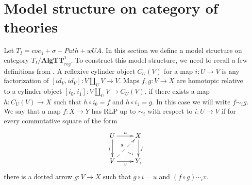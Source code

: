 \documentclass[reqno]{amsart}
\theoremstyle{definition}
\theoremstyle{remark}
\newcommand{\cat}[1]{\mathbf{#1}}
\newcommand{\Mod}[1]{#1\text{-}\cat{Mod}}
\newcommand{\algtt}{\cat{AlgTT}}
\newcommand{\cyli}{i}
\numberwithin{figure}{section}
\begin{document}
\begin{comment}
For every morphism $h : M \to N$ of models of $\mathbb{T}$, we can define a morphism $Lang^0_{con}(h) : Lang^0_{con}(M) \to Lang^0_{con}(N)$ of theories under $\mathbb{T}$ as $Lang(h)(O_a(\Gamma)) = O_{h(a)}(\Gamma)$.
Thus $Lang^0_{con}$ is a functor $\Mod{\mathbb{T}} \to \mathbb{T}/\algtt^0_{con}$.

\begin{prop}
$Lang^0_{con}$ is left adjoint to $Syn^0_{con}$.
\end{prop}
\begin{proof}
To prove this, it is enough to show that the composition of $Lang^0_{con}$ and the inclusion $\mathbb{T}/\algtt^0_{con} \to \mathbb{T}/\algtt^0$ is isomorphic to $Lang^0$.
Let $\alpha_M : Lang^0(M) \to Lang^0_{con}(M)$ be defined as $\alpha_M(O_a) = C_a$.
Let $\beta_M : Lang^0_{con}(M) \to Lang^0(M)$ be defined as $\beta_M(O_a(\Gamma)) = O_a|_{\Gamma = C_{M(ctx_{p,n})(a)}}$.
To prove that $\alpha$ and $\beta$ are inverses of each other, we need to show that $\sststile{}{\Gamma} O_a(\Gamma) \cong C_a|_{\Gamma = C_{M(ctx_{p,n})(a)}}$ is a theorem of $Lang^0_{con}(M)$.
But this follows from the first axiom of $Lang^0_{con}(M)$.
\end{proof}

For every algebraic dependent type theory with substitutions $\mathbb{T}$, there are adjoint functors $Lang^1 \dashv Syn^1 : \mathbb{T}/\algtt^1 \to \Mod{\mathbb{T}}$.
For every contextual algebraic dependent type theory with substitutions $\mathbb{T}$, there are adjoint functors $Lang^1_{con} \dashv Syn^1_{con} : \mathbb{T}/\algtt^1_{con} \to \Mod{\mathbb{T}}$.
These functors are defined in the same way as $Lang^0 \dashv Syn^0$ and $Lang^0_{con} \dashv Syn^0_{con}$.
\end{comment}

\section{Model structure on category of theories}

Let $T_I = coe_1 + \sigma + Path + wUA$.
In this section we define a model structure on category $T_I/\algtt^1_{reg}$.
To construct this model structure, we need to recall a few definitions from \cite{f-model-structures}.
A reflexive cylinder object $C_U(V)$ for a map $i : U \to V$ is any factorization of $[id_V,id_V] : V \amalg_U V \to V$.
Maps $f,g : V \to X$ are homotopic relative to a cylinder object $[\cyli_0,\cyli_1] : V \amalg_U V \to C_U(V)$, if there exists a map $h : C_U(V) \to X$
such that $h \circ \cyli_0 = f$ and $h \circ \cyli_1 = g$.
In this case we will write $f \sim_i g$.
We say that a map $f : X \to Y$ has RLP up to $\sim_i$ with respect to $i : U \to V$ if for every commutative square of the form
\[ \xymatrix{ U \ar[r]^u \ar@{}[dr]|(.7){\sim_i} \ar[d]_i & X \ar[d]^f \\
              V \ar[r]_v \ar@{-->}[ur]^g                  & Y,
            } \]
there is a dotted arrow $g : V \to X$ such that $g \circ i = u$ and $(f \circ g) \sim_i v$.
\end{document}
